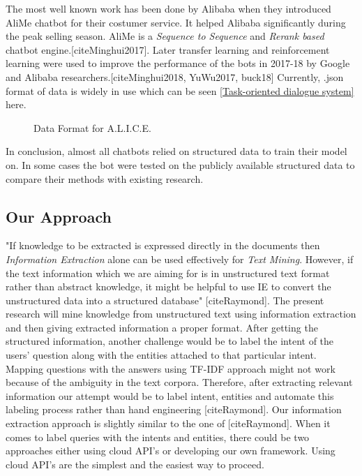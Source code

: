 \documentclass[a4paper,12pt]{article}
\begin{document}
The most well known work has been done by Alibaba when they introduced AliMe chatbot for their costumer service. It helped Alibaba significantly during the peak selling season. AliMe is a \textit{Sequence to Sequence} and \textit{Rerank based} chatbot engine.[cite{Minghui2017}]. Later transfer learning and reinforcement learning were used to improve the performance of the bots in 2017-18 by Google and Alibaba researchers.[cite{Minghui2018, YuWu2017, buck18}] Currently, .json format of data is widely in use which can be seen \ref{Task-oriented dialogue system} here. 

\begin{figure}
\caption{Data Format for A.L.I.C.E.}
\label{fig:Reflection}
\end{figure}

In conclusion, almost all chatbots relied on structured data to train their model on. In some cases the bot were tested on the publicly available structured data to compare their methods with existing research. 


\subsection{Our Approach}
"If knowledge to be extracted is expressed directly in the documents then \textit{Information Extraction} alone can be used effectively for \textit{Text Mining}. However, if the text information which we are aiming for is in unstructured text format rather than abstract knowledge, it might be helpful to use IE to convert the unstructured data into a structured database" [cite{Raymond}]. The present research will mine knowledge from unstructured text using information extraction and then giving extracted information a proper format. After getting the structured information, another challenge would be to label the intent of the users' question along with the entities attached to that particular intent. Mapping questions with the answers using TF-IDF approach might not work because of the ambiguity in the text corpora. Therefore, after extracting relevant information our attempt would be to label intent, entities and automate this labeling process rather than hand engineering [cite{Raymond}]. Our information extraction approach is slightly similar to the one of [cite{Raymond}]. When it comes to label queries with the intents and entities, there could be two approaches either using cloud API's or developing our own framework. Using cloud API's are the simplest and the easiest way to proceed. 
\end{document}
